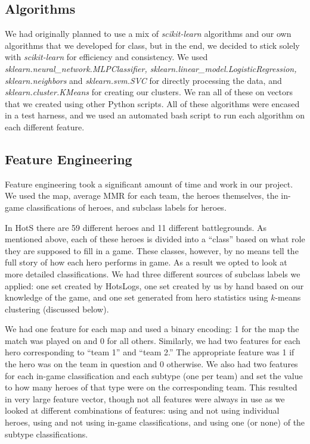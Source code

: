 \documentclass[11pt,letterpaper]{article}
\begin{document}
\subsection{Algorithms}
We had originally planned to use a mix of \textit{scikit-learn} algorithms and our own algorithms that we developed for class, but in the end, we decided to stick solely with \textit{scikit-learn} for efficiency and consistency. We used \textit{ sklearn.neural\_network.MLPClassifier, sklearn.linear\_model.LogisticRegression, sklearn.neighbors} and \textit{sklearn.svm.SVC} for directly processing the data, and \textit{sklearn.cluster.KMeans} for creating our clusters. We ran all of these on vectors that we created using other Python scripts. All of these algorithms were encased in a test harness, and we used an automated bash script to run each algorithm on each different feature.

\subsection{Feature Engineering}
Feature engineering took a significant amount of time and work in our project. We used the map, average MMR for each team, the heroes themselves, the in-game classifications of heroes, and subclass labels for heroes. 

In HotS there are 59 different heroes and 11 different battlegrounds. As mentioned above, each of these heroes is divided into a ``class'' based on what role they are supposed to fill in a game. These classes, however, by no means tell the full story of how each hero performs in game. As a result we opted to look at more detailed classifications. We had three different sources of subclass labels we applied: one set created by HotsLogs, one set created by us by hand based on our knowledge of the game, and one set generated from hero statistics using $k$-means clustering (discussed below).

We had one feature for each map and used a binary encoding: 1 for the map the match was played on and 0 for all others. Similarly, we had two features for each hero corresponding to ``team 1'' and ``team 2.'' The appropriate feature was 1 if the hero was on the team in question and 0 otherwise. We also had two features for each in-game classification and each subtype (one per team) and set the value to how many heroes of that type were on the corresponding team. This resulted in very large feature vector, though not all features were always in use as we looked at different combinations of features: using and not using individual heroes, using and not using in-game classifications, and using one (or none) of the subtype classifications.
\end{document}
